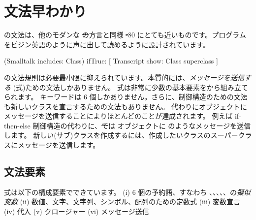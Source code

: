 \documentclass[a4paper,10pt,twoside]{book}
\begin{document}
	\renewcommand{\nnbb}[2]{} %
	\sloppy
\fi
\chapter{文法早わかり}



\pharo の文法は、他のモダンな \st の方言と同様 \st-80 にとても近いものです。プログラムをピジン英語のように声に出して読めるように設計されています。

\begin{code}{}
(Smalltalk includes: Class) ifTrue: [ Transcript show: Class superclass ]
\end{code}

\noindent
\pharo の文法規則は必要最小限に抑えられています。本質的には、\emph{メッセージを送信する} (\ie 式)ための文法しかありません。
式は非常に少数の基本要素をから組み立てられます。
キーワードは 6 個しかありません。さらに、制御構造のための文法も新しいクラスを宣言するための文法もありません。
代わりにオブジェクトにメッセージを送信することによりほとんどのことが達成されます。
例えば if-then-else 制御構造の代わりに、\st では  オブジェクトに  のようなメッセージを送信します。
新しい\mbox{(サブ)クラス}を作成するには、作成したいクラスのスーパークラスにメッセージを送信します。

\section{文法要素}

式は以下の構成要素でできています。
(i) 6 個の予約語、すなわち 、、、、、の\emph{擬似変数}
(ii) 数値、文字、文字列、シンボル、配列のための定数式
(iii) 変数宣言
(iv) 代入
(v) クロージャー
(vi) メッセージ送信
\end{document}
